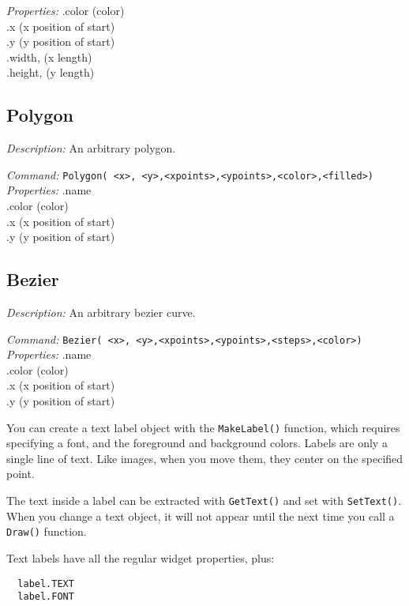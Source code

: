 \emph{Properties:}
.color (color) \\
.x  (x position of start) \\
.y  (y position of start)\\
.width, (x length)\\
.height,  (y length)\\




\subsection{Polygon}
\emph{Description:} An arbitrary polygon. 

\emph{Command:}  \verb+Polygon( <x>, <y>,<xpoints>,<ypoints>,<color>,<filled>)+\\

\emph{Properties:}
.name\\
.color (color) \\
.x  (x position of start) \\
.y  (y position of start)\\

\subsection{Bezier}
\emph{Description:} An arbitrary bezier curve.

\emph{Command:}  \verb+Bezier( <x>, <y>,<xpoints>,<ypoints>,<steps>,<color>)+\\

\emph{Properties:}
.name\\
.color (color) \\
.x  (x position of start) \\
.y  (y position of start)\\

\newpage
{}

You can create a text label object with the \texttt{MakeLabel()} function, 
which requires specifying a font, and the foreground and background colors.  Labels are only a single line of text. Like images, when you move them,
they center on the specified point.

The text inside a label can be extracted with \texttt{GetText()} 
and set with \texttt{SetText()}. When you change a text object, 
it will not appear until the next time you call a \texttt{Draw()} function.

Text labels have all the regular widget properties, plus:
\begin{verbatim}
  label.TEXT 
  label.FONT
\end{verbatim}
  


